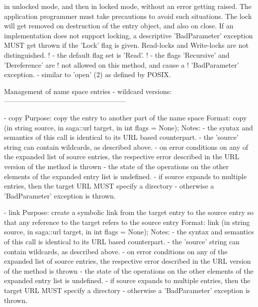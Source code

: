 \begin{myspec}
                  in unlocked mode, and then in locked mode,
                  without an error getting raised.  The
                  application programmer must take precautions
                  to avoid such situations.  The lock will get
                  removed on destruction of the entry object, and
                  also on close.  If an implementation does not
                  support locking, a descriptive 'BadParameter'
                  exception MUST get thrown if the 'Lock' flag 
                  is given.  Read-locks and Write-locks are not
                  distinguished.
!               - the default flag set is 'Read'.
!               - the flags 'Recursive' and 'Dereference' are 
!                 not allowed on this method, and cause a 
!                 'BadParameter' exception.
                - similar to 'open' (2) as defined by POSIX.
 
 
    Management of name space entries - wildcard versions:
    -----------------------------------------------------
 
    - copy
      Purpose:  copy the entry to another part of the name space
      Format:   copy               (in  string     source,
                                    in  saga::url  target,
                                    in  int        flags = None);
      Notes:    - the syntax and semantics of this call is 
                  identical to its URL based counterpart.  
                - the 'source' string can contain wildcards, as
                  described above.
                - on error conditions on any of the expanded 
                  list of source entries, the respective error 
                  described in the URL version of the method is 
                  thrown - the state of the operations on the 
                  other elements of the expanded entry list is 
                  undefined.
                - if source expands to multiple entries, then the
                  target URL MUST specify a directory -
                  otherwise a 'BadParameter' exception is thrown.
 
 
    - link
      Purpose:  create a symbolic link from the target entry to
                the source entry so that any reference to the
                target refers to the source entry
      Format:   link               (in  string     source,
                                    in  saga::url  target,
                                    in  int        flags = None);
      Notes:    - the syntax and semantics of this call is 
                  identical to its URL based counterpart.  
                - the 'source' string can contain wildcards, as
                  described above.
                - on error conditions on any of the expanded 
                  list of source entries, the respective error 
                  described in the URL version of the method is 
                  thrown - the state of the operations on the 
                  other elements of the expanded entry list is 
                  undefined.
                - if source expands to multiple entries, then the
                  target URL MUST specify a directory -
                  otherwise a 'BadParameter' exception is thrown.
 

\end{myspec}
